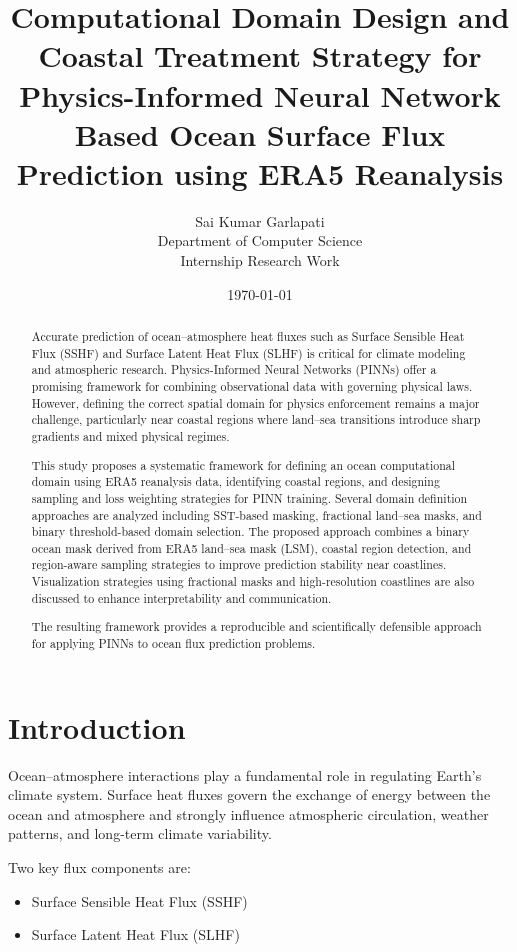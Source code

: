 \documentclass[12pt,a4paper]{article}
\title{\textbf{Computational Domain Design and Coastal Treatment Strategy for Physics-Informed Neural Network Based Ocean Surface Flux Prediction using ERA5 Reanalysis}}
\author{
Sai Kumar Garlapati \\
Department of Computer Science \\
Internship Research Work
}
\date{\today}
\begin{document}
\maketitle

\begin{abstract}

Accurate prediction of ocean–atmosphere heat fluxes such as Surface Sensible Heat Flux (SSHF) and Surface Latent Heat Flux (SLHF) is critical for climate modeling and atmospheric research. Physics-Informed Neural Networks (PINNs) offer a promising framework for combining observational data with governing physical laws. However, defining the correct spatial domain for physics enforcement remains a major challenge, particularly near coastal regions where land–sea transitions introduce sharp gradients and mixed physical regimes.

This study proposes a systematic framework for defining an ocean computational domain using ERA5 reanalysis data, identifying coastal regions, and designing sampling and loss weighting strategies for PINN training. Several domain definition approaches are analyzed including SST-based masking, fractional land–sea masks, and binary threshold-based domain selection. The proposed approach combines a binary ocean mask derived from ERA5 land–sea mask (LSM), coastal region detection, and region-aware sampling strategies to improve prediction stability near coastlines. Visualization strategies using fractional masks and high-resolution coastlines are also discussed to enhance interpretability and communication.

The resulting framework provides a reproducible and scientifically defensible approach for applying PINNs to ocean flux prediction problems.

\end{abstract}

\section{Introduction}

Ocean–atmosphere interactions play a fundamental role in regulating Earth’s climate system. Surface heat fluxes govern the exchange of energy between the ocean and atmosphere and strongly influence atmospheric circulation, weather patterns, and long-term climate variability.

Two key flux components are:

\begin{itemize}
\item Surface Sensible Heat Flux (SSHF)
\item Surface Latent Heat Flux (SLHF)
\end{itemize}
\end{document}
